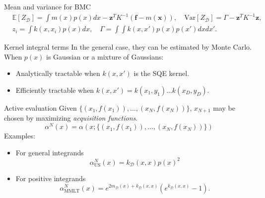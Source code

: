\documentclass{beamer}
\def \Ev {{\mathbb E}}
\newcommand{\Var}{\mathrm{Var}}
\begin{document}
\begin{frame}{}
\begin{block}{Mean and variance for BMC}
\begin{equation*}
\begin{split}
& \Ev[Z_{\mathcal{D}}] = \int m(x) p(x) dx - \mathbf{z}^T K^{-1} (\mathbf{f}-m(\mathbf{x})), \quad
\Var[Z_{\mathcal{D}}] = \Gamma - \mathbf{z}^T K^{-1} \mathbf{z}, \\
& z_i = \int k(x,x_i) p(x) dx, \quad \Gamma = \int \int k(x,x') p(x) p(x') dx dx'.
\end{split}
\end{equation*}
\end{block}
\begin{block}{Kernel integral terms}
In the general case, they can be estimated by Monte Carlo.
When $p(x)$ is Gaussian or a mixture of Gaussians:
\begin{itemize}
\item Analytically tractable when $k(x,x')$ is the SQE kernel.
\item Efficiently tractable when $k(x,x') = k(x_1,y_1) \ldots k(x_D,y_D)$.
\end{itemize}
\end{block}
\end{frame}
\begin{frame}
\begin{block}{Active evaluation}
Given $\{(x_1,f(x_1)),\ldots,(x_N,f(x_N))\}$, $x_{N+1}$ may be chosen by maximizing \textit{acquisition functions}.
\begin{equation*}
\alpha^N(x) = \alpha(x;\{(x_1,f(x_1)),\ldots,(x_N,f(x_N))\})
\end{equation*}
Examples:
\begin{itemize}
\item For general integrands
\begin{equation*}
\alpha^N_{\text{US}}(x) = k_\mathcal{D}(x,x) p(x)^2
\end{equation*}
\item For positive integrands
\begin{equation*}
\alpha^N_{\text{MMLT}}(x) = e^{2 m_\mathcal{D}(x) + k_\mathcal{D}(x,x)} \left(e^{k_\mathcal{D}(x,x)}-1\right).
\end{equation*}
\end{itemize}
\end{block}
\end{frame}
\end{document}
